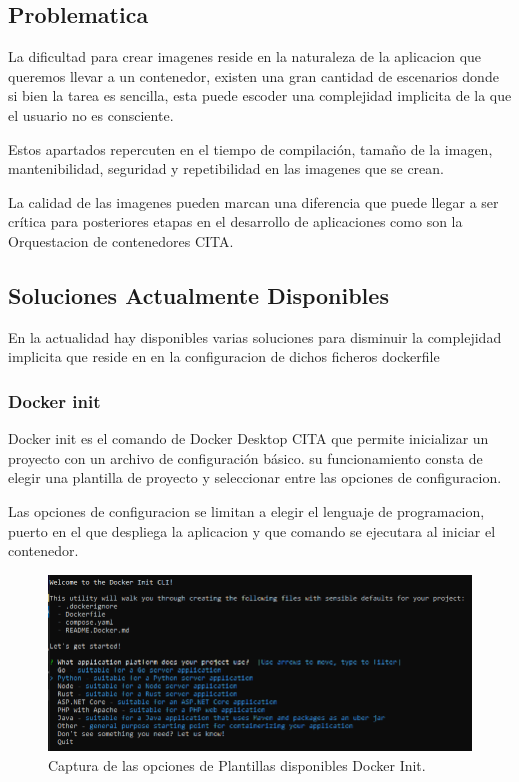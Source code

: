 \documentclass[12pt, a4paper, twoside]{article}
\begin{document}
\subsection{Problematica}
La dificultad para crear imagenes reside en la naturaleza de la aplicacion que queremos llevar a un contenedor, existen una gran cantidad de escenarios donde si bien la tarea es sencilla, esta puede escoder una complejidad implicita
de la que el usuario no es consciente. 

Estos apartados repercuten en el tiempo de compilación, tamaño de la imagen, mantenibilidad, seguridad y repetibilidad en las imagenes que se crean.

La calidad de las imagenes pueden marcan una diferencia que puede llegar a ser crítica para posteriores etapas en el desarrollo de aplicaciones como son la Orquestacion de contenedores CITA.

\subsection{Soluciones Actualmente Disponibles}
En la actualidad hay disponibles varias soluciones para disminuir la complejidad implicita que reside en en la configuracion de dichos ficheros dockerfile 
\subsubsection{Docker init}
Docker init es el comando de Docker Desktop CITA que permite inicializar un proyecto con un archivo de configuración básico.
su funcionamiento consta de elegir una plantilla de proyecto y seleccionar entre las opciones de configuracion.

Las opciones de configuracion se limitan a elegir el lenguaje de programacion, puerto en el que despliega la aplicacion y que comando se ejecutara al iniciar el contenedor.

\begin{figure}[ht]
  \centering
    \includegraphics[width=1\textwidth]{Docker Init.png}
  \caption{Captura de las opciones de Plantillas disponibles Docker Init.}
\end{figure}
\end{document}
